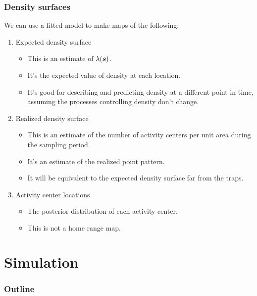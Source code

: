 \documentclass[color=usenames,dvipsnames]{beamer}\usepackage[]{graphicx}\usepackage[]{color}
\begin{document}
\begin{frame}
  \frametitle{Density surfaces}
  \large
  We can use a fitted model to make maps of the following: 
  \begin{enumerate}
    \item<1-> Expected density surface%
    \begin{itemize}
      \item This is an estimate of $\lambda({\bm s})$.
      \item It's the expected value of density at  each location.
      \item It's good for describing and predicting density at a
        different point in time, assuming the processes controlling
        density don't change.
    \end{itemize}
    \item<2-> Realized density surface%
      \begin{itemize}
        \item This is an estimate of the number of activity centers
          per unit area \alert{during the sampling period}.
        \item It's an estimate of the realized point pattern.
        \item It will be equivalent to the expected density surface
          far from the traps. 
      \end{itemize}
    \item<3-> Activity center locations%
      \begin{itemize}
        \item The posterior distribution of each activity center.
        \item This is not a home range map.
      \end{itemize}
  \end{enumerate}
\end{frame}



\section{Simulation}


\begin{frame}
  \frametitle{Outline}
  \Large
  \tableofcontents[currentsection]
\end{frame}
\end{document}
